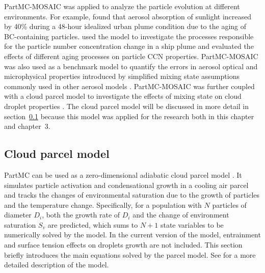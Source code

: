 \documentclass[edeposit,fullpage]{uiucthesis2009}
\begin{document}
PartMC-MOSAIC was applied to analyze the particle evolution at
different environments. For example, \citet{Zaveri2010a} found that
aerosol absorption of sunlight increased by 40\% during a 48-hour
idealized urban plume condition due to the aging of BC-containing
particles. \citet{tian2014modeling} used the model to investigate the
processes responsible for the particle number concentration change in
a ship plume and evaluated the effects of different aging processes on
particle CCN properties. PartMC-MOSAIC was also used as a benchmark
model to quantify the errors in aerosol optical and microphysical
properties introduced by simplified mixing state assumptions commonly
used in other aerosol models \citep{Zaveri2010a, ching2012impacts,
  Fierce2017}. PartMC-MOSAIC was further coupled with a cloud parcel
model to investigate the effects of mixing state on cloud droplet
properties \citep{ching2012impacts, Ching2016}. The cloud parcel model
will be discussed in more detail in
section~\ref{section:cloud-parcel-model} because this model was
applied for the research both in this chapter and chapter~3.

\subsection{Cloud parcel model}
\label{section:cloud-parcel-model}
PartMC can be used as a zero-dimensional adiabatic cloud parcel model
\citep{ching2012impacts}. It simulates particle activation and condensational
growth in a cooling air parcel and tracks the changes of environmental
saturation due to the growth of particles and the temperature
change. Specifically, for a population with $N$ particles of diameter
$D_i$, both the growth rate of $D_i$ and the change of environment
saturation $S_v$ are predicted, which sums to $N + 1$ state variables
to be numerically solved by the model. In the current version of the
model, entrainment and surface tension effects on droplets growth are
not included. This section briefly introduces the main equations
solved by the parcel model. See \citet{ching2012impacts} for a more
detailed description of the model.
\end{document}
